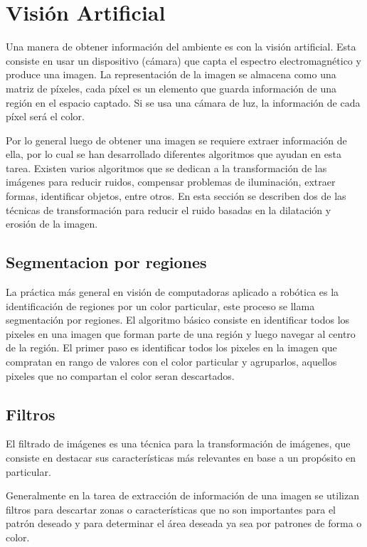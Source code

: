 \section{Visión Artificial} \label{sect:Vision_Artificial}

Una manera de obtener información del ambiente es con la visión artificial. Esta consiste en usar un dispositivo (cámara) que
capta el espectro electromagnético y produce una imagen. La representación de la imagen se almacena como una matriz de píxeles,
cada píxel es un elemento que guarda información de una región en el espacio captado. Si se usa una cámara de luz, la información
de cada píxel será el color. \cite{AiRobotics}  

Por lo general luego de obtener una imagen se requiere extraer información de ella, por lo cual se han desarrollado diferentes
algoritmos que ayudan en esta tarea. Existen varios algoritmos que se dedican a la transformación de las imágenes para reducir
ruidos, compensar problemas de iluminación, extraer formas, identificar objetos, entre otros. En esta sección se describen dos
de las técnicas de transformación para reducir el ruido basadas en la dilatación y erosión de la imagen. 
\subsection{Segmentacion por regiones}

La pr\'actica m\'as general en visi\'on de computadoras aplicado a rob\'otica es la identificaci\'on de regiones por un color particular, este proceso se llama segmentaci\'on por regiones. El algoritmo b\'asico consiste en  identificar todos los pixeles en una imagen que forman parte de una regi\'on y luego navegar al centro de la regi\'on. El primer paso es identificar todos los pixeles en la imagen que compratan en rango de valores con el color particular y agruparlos, aquellos pixeles que no compartan el color seran descartados. \cite{BookOpenCv}

\subsection{Filtros }
El filtrado de imágenes es una técnica para la transformación de imágenes, que consiste en destacar  sus características más relevantes en base a un propósito en particular. 

Generalmente en la tarea de extracción de información de una imagen se utilizan filtros para descartar zonas o características que no son importantes para el patrón deseado y para determinar el área deseada ya sea por patrones de forma o color.

